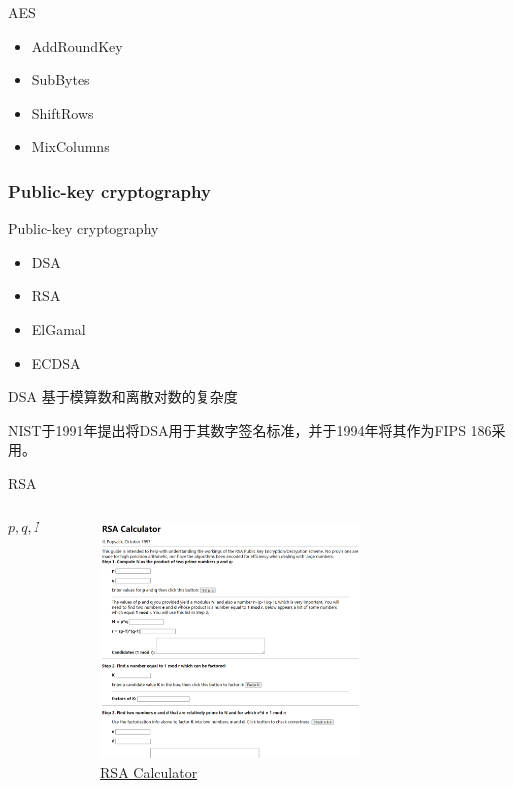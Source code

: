 \documentclass[UTF8]{ctexbeamer}
\begin{document}
\begin{frame}{AES}
    \begin{itemize}
        \item AddRoundKey
        \item SubBytes
        \item ShiftRows
        \item MixColumns
    \end{itemize}
\end{frame}
\subsubsection{Public-key cryptography}
\begin{frame}{Public-key cryptography}
    \begin{itemize}
        \item DSA
        \item RSA
        \item ElGamal
        \item ECDSA
    \end{itemize}
\end{frame}

\begin{frame}{DSA}
    基于模算数和离散对数的复杂度
    
    NIST于1991年提出将DSA用于其数字签名标准，并于1994年将其作为FIPS 186采用。
    
\end{frame}
\begin{frame}{RSA}

    \begin{columns}
        \begin{column}{0.3\textwidth}
            $$p, q, N, r, e, d$$
        \end{column}
        \begin{column}{0.7\textwidth}
            \begin{figure}
                \centering
                \includegraphics[width=0.7\textwidth]{rsa-calc.png}
                \caption{\href{https://www.cs.drexel.edu/~jpopyack/IntroCS/HW/RSAWorksheet.html}{RSA Calculator}}
            \end{figure}
        \end{column}
    \end{columns}
\end{frame}
\end{document}
